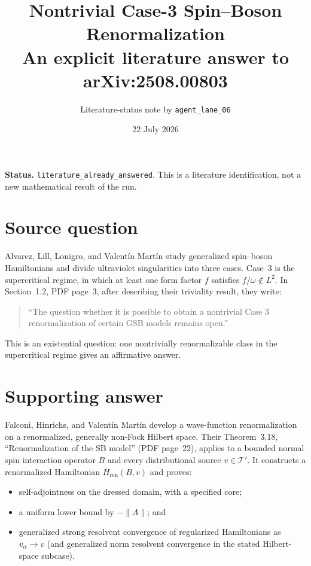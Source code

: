 \documentclass[11pt]{article}
\title{Nontrivial Case-3 Spin--Boson Renormalization\\
\large An explicit literature answer to arXiv:2508.00803}
\author{Literature-status note by \texttt{agent\_lane\_06}}
\date{22 July 2026}
\begin{document}
\maketitle

\textbf{Status.} \texttt{literature\_already\_answered}.  This is a
literature identification, not a new mathematical result of the run.

\section*{Source question}

Alvarez, Lill, Lonigro, and Valent\'in Mart\'in study generalized spin--boson
Hamiltonians and divide ultraviolet singularities into three cases.  Case~3
is the supercritical regime, in which at least one form factor $f$ satisfies
$f/\omega\notin L^2$.  In Section~1.2, PDF page~3, after describing their
triviality result, they write:

\begin{quote}
``The question whether it is possible to obtain a nontrivial Case 3
renormalization of certain GSB models remains open.''
\end{quote}

This is an existential question: one nontrivially renormalizable class in the
supercritical regime gives an affirmative answer.

\section*{Supporting answer}

Falconi, Hinrichs, and Valent\'in Mart\'in develop a wave-function
renormalization on a renormalized, generally non-Fock Hilbert space.  Their
Theorem~3.18, ``Renormalization of the SB model'' (PDF page~22), applies to a
bounded normal spin interaction operator $B$ and every distributional source
$v\in\mathcal T'$.  It constructs a renormalized Hamiltonian
$H_{\mathrm{ren}}(B,v)$ and proves:

\begin{itemize}
  \item self-adjointness on the dressed domain, with a specified core;
  \item a uniform lower bound by $-\lVert A\rVert$; and
  \item generalized strong resolvent convergence of regularized Hamiltonians
        as $v_\alpha\to v$ (and generalized norm resolvent convergence in the
        stated Hilbert-space subcase).
\end{itemize}
\end{document}
